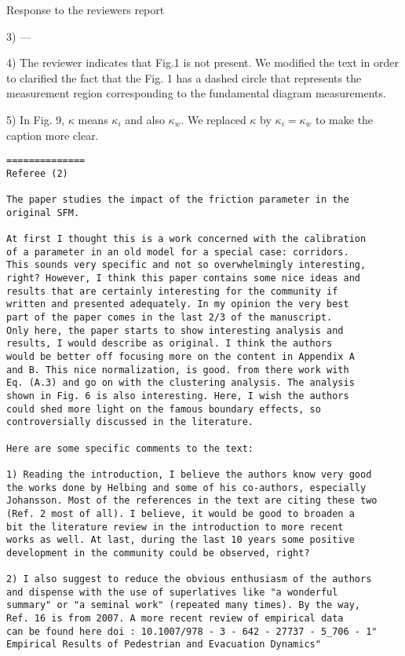 \documentclass[a4paper,12pt]{letter}
\begin{document}
\begin{letter}{Response to the reviewers report}
{3) ---

4) The reviewer indicates that Fig.1 is not present. We modified the text in order to clarified the fact that the Fig. 1 has a 
dashed circle that represents the measurement region corresponding to the fundamental diagram measurements. 

5) In Fig. 9, $\kappa$ means $\kappa_i$ and also $\kappa_w$. We replaced $\kappa$ by $\kappa_i = \kappa_w$ to make the caption more clear.   


}

\newpage

\begin{verbatim}
==============
Referee (2)

The paper studies the impact of the friction parameter in the 
original SFM.

At first I thought this is a work concerned with the calibration 
of a parameter in an old model for a special case: corridors. 
This sounds very specific and not so overwhelmingly interesting,
right? However, I think this paper contains some nice ideas and 
results that are certainly interesting for the community if 
written and presented adequately. In my opinion the very best 
part of the paper comes in the last 2/3 of the manuscript.
Only here, the paper starts to show interesting analysis and 
results, I would describe as original. I think the authors 
would be better off focusing more on the content in Appendix A
and B. This nice normalization, is good. from there work with 
Eq. (A.3) and go on with the clustering analysis. The analysis 
shown in Fig. 6 is also interesting. Here, I wish the authors 
could shed more light on the famous boundary effects, so
controversially discussed in the literature.

Here are some specific comments to the text:

1) Reading the introduction, I believe the authors know very good 
the works done by Helbing and some of his co-authors, especially 
Johansson. Most of the references in the text are citing these two 
(Ref. 2 most of all). I believe, it would be good to broaden a 
bit the literature review in the introduction to more recent 
works as well. At last, during the last 10 years some positive 
development in the community could be observed, right?

2) I also suggest to reduce the obvious enthusiasm of the authors 
and dispense with the use of superlatives like "a wonderful 
summary" or "a seminal work" (repeated many times). By the way, 
Ref. 16 is from 2007. A more recent review of empirical data 
can be found here doi : 10.1007/978 - 3 - 642 - 27737 - 5_706 - 1"
Empirical Results of Pedestrian and Evacuation Dynamics"


\end{verbatim}
\end{letter}
\end{document}
